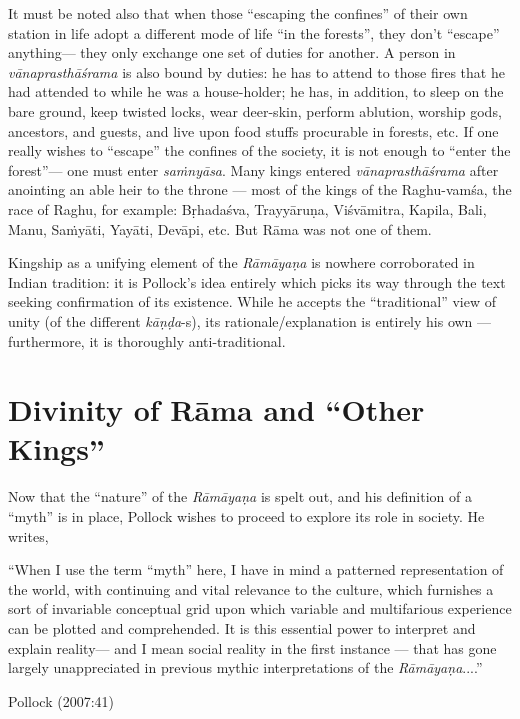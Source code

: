 It must be noted also that when those “escaping the confines” of their own station in life adopt a different mode of life “in the forests”, they don’t “escape” anything--- they only exchange one set of duties for another. A person in {\sl vānaprasthāśrama} is also bound by duties: he has to attend to those fires that he had attended to while he was a house-holder; he has, in addition, to sleep on the bare ground, keep twisted locks, wear deer-skin, perform ablution, worship gods, ancestors, and guests, and live upon food stuffs procurable in forests, etc. If one really wishes to “escape” the confines of the society, it is not enough to “enter the forest”--- one must enter {\sl saṁnyāsa}. Many kings entered {\sl vānaprasthāśrama} after anointing an able heir to the throne --- most of the kings of the Raghu-vamśa, the race of Raghu, for example: Bṛhadaśva, Trayyāruṇa, Viśvāmitra, Kapila, Bali, Manu, Saṁyāti, Yayāti, Devāpi, etc. But Rāma was not one of them. 

Kingship as a unifying element of the {\sl Rāmāyaṇa} is nowhere corroborated in Indian tradition: it is Pollock’s idea entirely which picks its way through the text seeking confirmation of its existence. While he accepts the “traditional” view of unity (of the different \hbox{{\sl kāṇḍa}-s}), its rationale/explanation is entirely his own --- furthermore, it is thoroughly anti-traditional.

\section{Divinity of Rāma and “Other Kings”}\label{sec2.4}

Now that the “nature” of the {\sl Rāmāyaṇa} is spelt out, and his definition of a “myth” is in place, Pollock wishes to proceed to explore its role in society. He writes, 

\begin{myquote}
“When I use the term “myth” here, I have in mind a patterned representation of the world, with continuing and vital relevance to the culture, which furnishes a sort of invariable conceptual grid upon which variable and multifarious experience can be plotted and comprehended. It is this essential power to interpret and explain reality--- and I mean social reality in the first instance --- that has gone largely unappreciated in previous mythic interpretations of the {\sl Rāmāyaṇa}....” 

\hfill Pollock (2007:41)
\end{myquote}

